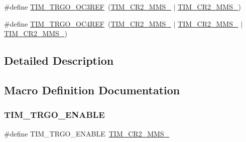 \begin{DoxyCompactItemize}
\item 
\#define \mbox{\hyperlink{group___t_i_m___master___mode___selection_ga4bc4791f8b9560950d30078b96d08f55}{T\+I\+M\+\_\+\+T\+R\+G\+O\+\_\+\+O\+C3\+R\+EF}}~(\mbox{\hyperlink{group___peripheral___registers___bits___definition_gacb74a815afdd856d51cfcf1ddf3fce6a}{T\+I\+M\+\_\+\+C\+R2\+\_\+\+M\+M\+S\+\_}} $\vert$ \mbox{\hyperlink{group___peripheral___registers___bits___definition_ga4b1036929b0a4ba5bd5cced9b8e0f4c3}{T\+I\+M\+\_\+\+C\+R2\+\_\+\+M\+M\+S\+\_}})
\item 
\#define \mbox{\hyperlink{group___t_i_m___master___mode___selection_ga7fe6228adec5d1b6f0a8ed8da111db4d}{T\+I\+M\+\_\+\+T\+R\+G\+O\+\_\+\+O\+C4\+R\+EF}}~(\mbox{\hyperlink{group___peripheral___registers___bits___definition_gacb74a815afdd856d51cfcf1ddf3fce6a}{T\+I\+M\+\_\+\+C\+R2\+\_\+\+M\+M\+S\+\_}} $\vert$ \mbox{\hyperlink{group___peripheral___registers___bits___definition_ga4b1036929b0a4ba5bd5cced9b8e0f4c3}{T\+I\+M\+\_\+\+C\+R2\+\_\+\+M\+M\+S\+\_}} $\vert$ \mbox{\hyperlink{group___peripheral___registers___bits___definition_gaf3e55308e84106d6501201e66bd46ab6}{T\+I\+M\+\_\+\+C\+R2\+\_\+\+M\+M\+S\+\_}})
\end{DoxyCompactItemize}


\subsection{Detailed Description}


\subsection{Macro Definition Documentation}
\mbox{\label{group___t_i_m___master___mode___selection_ga4ac300b0fd24d1e6532e5961680a39a9}} 
\subsubsection{\texorpdfstring{TIM\_TRGO\_ENABLE}{TIM\_TRGO\_ENABLE}}
{\footnotesize\ttfamily \#define T\+I\+M\+\_\+\+T\+R\+G\+O\+\_\+\+E\+N\+A\+B\+LE~\mbox{\hyperlink{group___peripheral___registers___bits___definition_gaf3e55308e84106d6501201e66bd46ab6}{T\+I\+M\+\_\+\+C\+R2\+\_\+\+M\+M\+S\+\_}}}

